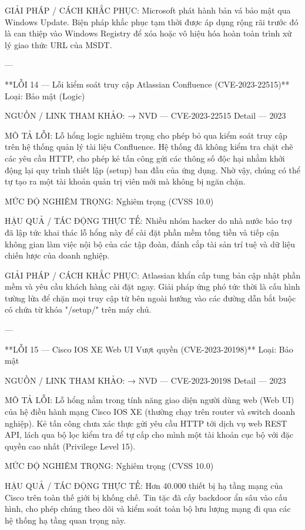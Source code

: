 GIẢI PHÁP / CÁCH KHẮC PHỤC:
Microsoft phát hành bản vá bảo mật qua Windows Update. Biện pháp khắc phục tạm thời được áp dụng rộng rãi trước đó là can thiệp vào Windows Registry để xóa hoặc vô hiệu hóa hoàn toàn trình xử lý giao thức URL của MSDT.

---

**LỖI 14 — Lỗi kiểm soát truy cập Atlassian Confluence (CVE-2023-22515)**
Loại: Bảo mật (Logic)

NGUỒN / LINK THAM KHẢO:
→ NVD — CVE-2023-22515 Detail — 2023

MÔ TẢ LỖI:
Lỗ hổng logic nghiêm trọng cho phép bỏ qua kiểm soát truy cập trên hệ thống quản lý tài liệu Confluence. Hệ thống đã không kiểm tra chặt chẽ các yêu cầu HTTP, cho phép kẻ tấn công gửi các thông số độc hại nhằm khởi động lại quy trình thiết lập (setup) ban đầu của ứng dụng. Nhờ vậy, chúng có thể tự tạo ra một tài khoản quản trị viên mới mà không bị ngăn chặn.

MỨC ĐỘ NGHIÊM TRỌNG:
Nghiêm trọng (CVSS 10.0)

HẬU QUẢ / TÁC ĐỘNG THỰC TẾ:
Nhiều nhóm hacker do nhà nước bảo trợ đã lập tức khai thác lỗ hổng này để cài đặt phần mềm tống tiền và tiếp cận không gian làm việc nội bộ của các tập đoàn, đánh cắp tài sản trí tuệ và dữ liệu chiến lược của doanh nghiệp.

GIẢI PHÁP / CÁCH KHẮC PHỤC:
Atlassian khẩn cấp tung bản cập nhật phần mềm và yêu cầu khách hàng cài đặt ngay. Giải pháp ứng phó tức thời là cấu hình tường lửa để chặn mọi truy cập từ bên ngoài hướng vào các đường dẫn bắt buộc có chứa từ khóa "/setup/" trên máy chủ.

---

**LỖI 15 — Cisco IOS XE Web UI Vượt quyền (CVE-2023-20198)**
Loại: Bảo mật

NGUỒN / LINK THAM KHẢO:
→ NVD — CVE-2023-20198 Detail — 2023

MÔ TẢ LỖI:
Lỗ hổng nằm trong tính năng giao diện người dùng web (Web UI) của hệ điều hành mạng Cisco IOS XE (thường chạy trên router và switch doanh nghiệp). Kẻ tấn công chưa xác thực gửi yêu cầu HTTP tới dịch vụ web REST API, lách qua bộ lọc kiểm tra để tự cấp cho mình một tài khoản cục bộ với đặc quyền cao nhất (Privilege Level 15).

MỨC ĐỘ NGHIÊM TRỌNG:
Nghiêm trọng (CVSS 10.0)

HẬU QUẢ / TÁC ĐỘNG THỰC TẾ:
Hơn 40.000 thiết bị hạ tầng mạng của Cisco trên toàn thế giới bị khống chế. Tin tặc đã cấy backdoor ẩn sâu vào cấu hình, cho phép chúng theo dõi và kiểm soát toàn bộ lưu lượng mạng đi qua các hệ thống hạ tầng quan trọng này.

